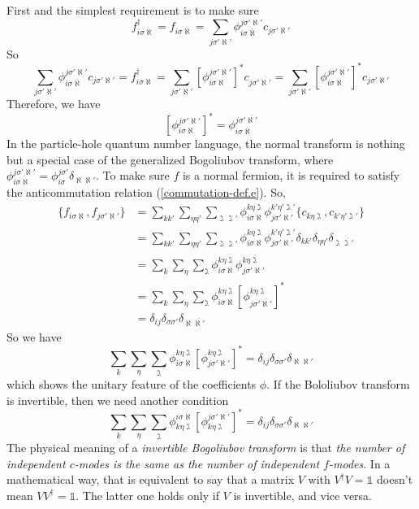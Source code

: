 \documentclass[12font]{article}
\theoremstyle{definition}
\numberwithin{equation}{section}
\newcommand{\llrg}[1]{\{  #1  \}}
\newcommand{\lrm}[1]{\left[  #1  \right]}
\begin{document}
First and the simplest requirement is to make sure 
\[
f_{i\sigma\aleph}^\dagger = f_{i\sigma\overline{\aleph}} = \sum_{j\sigma'\aleph'}\phi^{j\sigma'\aleph'}_{i\sigma\overline{\aleph}}c_{j\sigma'\aleph'}
\]
So
\[
\sum_{j\sigma'\aleph'}\phi^{j\sigma'\aleph'}_{i\sigma\overline{\aleph}}c_{j\sigma'\aleph'} = f_{i\sigma\aleph}^\dagger = \sum_{j\sigma'\aleph'}\lrm{\phi^{j\sigma'\aleph'}_{i\sigma\aleph}}^* c_{j\sigma'\overline{\aleph'}} = \sum_{j\sigma'\aleph'}\lrm{\phi^{j\sigma'\overline{\aleph'}}_{i\sigma\aleph}}^* c_{j\sigma'\aleph'} 
\]
Therefore, we have
\begin{equation}\label{hermitian-change.e}
   \lrm{\phi^{j\sigma'\aleph'}_{i\sigma\aleph}}^*= \phi^{j\sigma'\overline{\aleph'}}_{i\sigma\overline{\aleph}}
\end{equation}
In the particle-hole quantum number language, the normal transform is nothing but a special case of the generalized Bogoliubov transform, where $\phi^{j\sigma'\aleph'}_{i\sigma\aleph} = \phi^{j\sigma'}_{i\sigma}\delta_{\aleph\aleph'}$. To make sure $f$ is a normal fermion, it is required to satisfy the anticommutation relation (\ref{commutation-def.e}). So, 
\begin{align*}
    \llrg{f_{i\sigma\aleph},f_{j\sigma'\aleph'}} &= \sum_{kk'}\sum_{\eta\eta'}\sum_{\gimel\gimel'} \phi^{k\eta\gimel}_{i\sigma\aleph} \phi^{k'\eta'\gimel'}_{j\sigma'\aleph'} \llrg{ c_{k\eta\gimel}, c_{k'\eta'\gimel'} }\\ 
    &= \sum_{kk'}\sum_{\eta\eta'}\sum_{\gimel\gimel'} \phi^{k\eta\gimel}_{i\sigma\aleph} \phi^{k'\eta'\gimel'}_{j\sigma'\aleph'} \delta_{kk'} \delta_{\eta\eta'}\delta_{\gimel\overline{\gimel'}} \\
    &= \sum_{k}\sum_{\eta}\sum_{\gimel} \phi^{k\eta\gimel}_{i\sigma\aleph} \phi^{k\eta\overline{\gimel}}_{j\sigma'\aleph'} \\
    &= \sum_{k}\sum_{\eta}\sum_{\gimel} \phi^{k\eta\gimel}_{i\sigma\aleph} \lrm{\phi^{k\eta\gimel}_{j\sigma'\overline{\aleph'}}}^*\\
    &=\delta_{ij}\delta_{\sigma\sigma'}\delta_{\aleph\overline{\aleph'}}
\end{align*}
So we have
\begin{equation}\label{unitary.e}
  \sum_{k}\sum_{\eta}\sum_{\gimel} \phi^{k\eta\gimel}_{i\sigma\aleph} \lrm{\phi^{k\eta\gimel}_{j\sigma'\aleph'}}^* =\delta_{ij}\delta_{\sigma\sigma'}\delta_{\aleph\aleph'}
\end{equation}
which shows the unitary feature of the coefficients $\phi$. If the Bololiubov transform is invertible, then we need another condition
\begin{equation}\label{unitary-true.e}
  \sum_{k}\sum_{\eta}\sum_{\gimel} \phi_{k\eta\gimel}^{i\sigma\aleph} \lrm{\phi_{k\eta\gimel}^{j\sigma'\aleph'}}^* =\delta_{ij}\delta_{\sigma\sigma'}\delta_{\aleph\aleph'}
\end{equation}
The physical meaning of a \emph{invertible Bogoliubov transform} is that \emph{the number of independent $c$-modes is the same as the number of independent $f$-modes}. In a mathematical way, that is equivalent to say that a matrix $V$ with $V^\dagger V=\mathds{1}$ doesn't mean $V V^\dagger = \mathds{1}$. The latter one holds only if $V$ is invertible, and vice versa.
\end{document}
